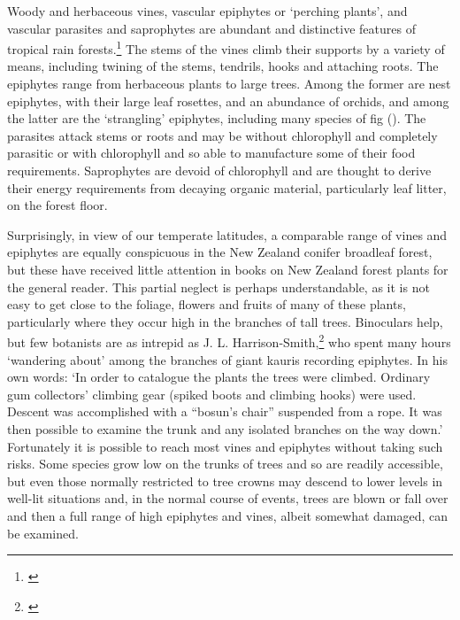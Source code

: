 Woody and herbaceous vines, vascular epiphytes or `perching plants', and vascular parasites and saprophytes are abundant and distinctive features of tropical rain forests.\footnote{\cite{richards1952tropical}}
The stems of the vines climb their supports by a variety of means, including twining of the stems, tendrils, hooks and attaching roots.
The epiphytes range from herbaceous plants to large trees.
Among the former are nest epiphytes, with their large leaf rosettes, and an abundance of orchids, and among the latter are the `strangling' epiphytes, including many species of fig ().
The parasites attack stems or roots and may be without chlorophyll and completely parasitic or with chlorophyll and so able to manufacture some of their food requirements.
Saprophytes are devoid of chlorophyll and are thought to derive their energy requirements from decaying organic material, particularly leaf litter, on the forest floor.

Surprisingly, in view of our temperate latitudes, a comparable range of vines and epiphytes are equally conspicuous in the New Zealand conifer broadleaf forest, but these have received little attention in books on New Zealand forest plants for the general reader.
This partial neglect is perhaps understandable, as it is not easy to get close to the foliage, flowers and fruits of many of these plants, particularly where they occur high in the branches of tall trees.
Binoculars help, but few botanists are as intrepid as J. L. Harrison-Smith,\footnote{\cite{harrisonsmith1938kauri}} who spent many hours `wandering about' among the branches of giant kauris recording epiphytes.
In his own words: `In order to catalogue the plants the trees were climbed.
Ordinary gum collectors' climbing gear (spiked boots and climbing hooks) were used.
Descent was accomplished with a ``bosun's chair'' suspended from a rope.
It was then possible to examine the trunk and any isolated branches on the way down.' Fortunately it is possible to reach most vines and epiphytes without taking such risks.
Some species grow low on the trunks of trees and so are readily accessible, but even those normally restricted to tree crowns may descend to lower levels in well-lit situations and, in the normal course of events, trees are blown or fall over and then a full range of high epiphytes and vines, albeit somewhat damaged, can be examined.

